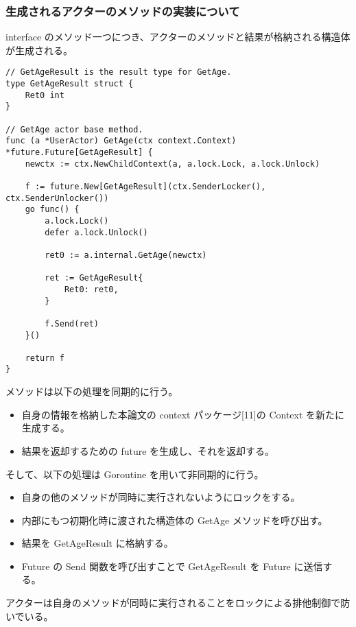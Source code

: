 \subsubsection{生成されるアクターのメソッドの実装について}

interface
のメソッド一つにつき、アクターのメソッドと結果が格納される構造体が生成される。

\begin{verbatim}
// GetAgeResult is the result type for GetAge.
type GetAgeResult struct {
    Ret0 int
}

// GetAge actor base method.
func (a *UserActor) GetAge(ctx context.Context) *future.Future[GetAgeResult] {
    newctx := ctx.NewChildContext(a, a.lock.Lock, a.lock.Unlock)

    f := future.New[GetAgeResult](ctx.SenderLocker(), ctx.SenderUnlocker())
    go func() {
        a.lock.Lock()
        defer a.lock.Unlock()

        ret0 := a.internal.GetAge(newctx)

        ret := GetAgeResult{
            Ret0: ret0,
        }

        f.Send(ret)
    }()

    return f
}
\end{verbatim}

メソッドは以下の処理を同期的に行う。

\begin{itemize}
\item
  自身の情報を格納した本論文の context パッケージ{[}11{]}の Context
  を新たに生成する。
\item
  結果を返却するための future を生成し、それを返却する。
\end{itemize}

そして、以下の処理は Goroutine を用いて非同期的に行う。

\begin{itemize}
\item
  自身の他のメソッドが同時に実行されないようにロックをする。
\item
  内部にもつ初期化時に渡された構造体の GetAge メソッドを呼び出す。
\item
  結果を GetAgeResult に格納する。
\item
  Future の Send 関数を呼び出すことで GetAgeResult を Future
  に送信する。
\end{itemize}

アクターは自身のメソッドが同時に実行されることをロックによる排他制御で防いでいる。

